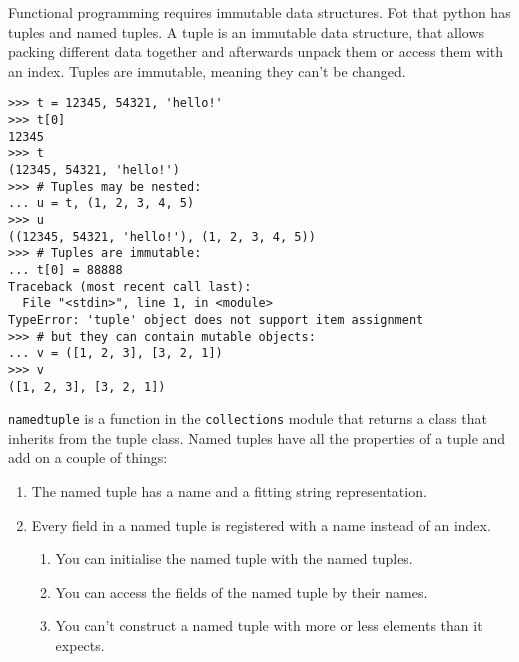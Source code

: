 Functional programming requires immutable data structures. Fot that python has
tuples and named tuples. A tuple is an immutable data structure, that allows
packing different data together and afterwards unpack them or access them with
an index. Tuples are immutable, meaning they can't be changed.
\begin{verbatim}
>>> t = 12345, 54321, 'hello!'
>>> t[0]
12345
>>> t
(12345, 54321, 'hello!')
>>> # Tuples may be nested:
... u = t, (1, 2, 3, 4, 5)
>>> u
((12345, 54321, 'hello!'), (1, 2, 3, 4, 5))
>>> # Tuples are immutable:
... t[0] = 88888
Traceback (most recent call last):
  File "<stdin>", line 1, in <module>
TypeError: 'tuple' object does not support item assignment
>>> # but they can contain mutable objects:
... v = ([1, 2, 3], [3, 2, 1])
>>> v
([1, 2, 3], [3, 2, 1])
\end{verbatim}
\verb;namedtuple; is a function in the \verb;collections; module that returns a
class that inherits from the tuple class. Named tuples have all the properties
of a tuple and add on a couple of things:
\begin{enumerate}
  \item The named tuple has a name and a fitting string representation.
  \item Every field in a named tuple is registered with a name instead of an
  index.
\begin{enumerate}
  \item You can initialise the named tuple with the named tuples.
  \item You can access the fields of the named tuple by their names.
  \item You can't construct a named tuple with more or less elements than it
  expects.
\end{enumerate}
\end{enumerate}

